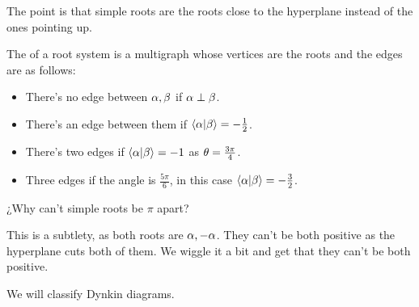 \documentclass[12pt]{memoir}
\begin{document}
The point is that simple roots are the roots close to the hyperplane instead of the ones pointing up.

\begin{Def}
    The  of a root system is a multigraph whose vertices are the roots and the edges are as follows:
    \begin{itemize}
        \item There's no edge between $\alpha,\beta$ if $\alpha\perp\beta$.
        \item There's an edge between them if $\braket{\al}{\bt}=-\half$.
        \item There's two edges if $\braket{\alpha}{\beta}=-1$ as $\theta=\frac{3\pi}{4}$.
        \item Three edges if the angle is $\frac{5\pi}{6}$, in this case $\braket{\alpha}{\beta}=-\frac{3}{2}$.
    \end{itemize}
\end{Def}

\begin{Qn}
    ¿Why can't simple roots be $\pi$ apart?
\end{Qn}

This is a subtlety, as both roots are $\alpha,-\alpha$. They can't be both positive as the hyperplane cuts both of them. We wiggle it a bit and get that they can't be both positive.\par
We will classify Dynkin diagrams. 
\end{document}
